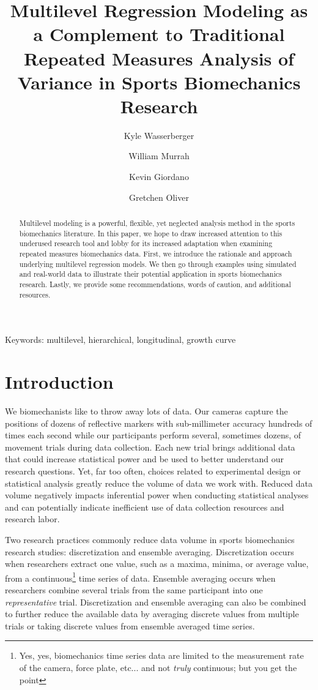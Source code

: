 \documentclass[
]{article}
\author[1]{\footnotesize Kyle Wasserberger}
\author[3]{\footnotesize William Murrah}
\author[4]{\footnotesize Kevin Giordano}
\author[2]{\footnotesize Gretchen Oliver}
\affil[1]{Research \& Development; Driveline Baseball}
\affil[2]{School of Kinesiology; Auburn University}
\affil[3]{\footnotesize Department of Educational Foundations, Leadership, \& Technology; Auburn University}
\affil[4]{\footnotesize Department of Physical Therapy; Creighton University}
\title{Multilevel Regression Modeling as a Complement to Traditional Repeated Measures Analysis of Variance in Sports Biomechanics Research}
\date{\vspace{-2.5em}}
\begin{document}
\maketitle

\begin{center}
Keywords: multilevel, hierarchical, longitudinal, growth curve
\end{center}

\newpage
\linenumbers
\begin{abstract}
\doublespacing
Multilevel modeling is a powerful, flexible, yet neglected analysis method in the sports biomechanics literature. In this paper, we hope to draw increased attention to this underused research tool and lobby for its increased adaptation when examining repeated measures biomechanics data. First, we introduce the rationale and approach underlying multilevel regression models. We then go through examples using simulated and real-world data to illustrate their potential application in sports biomechanics research. Lastly, we provide some recommendations, words of caution, and additional resources.
\end{abstract}

\newpage
{}

\hypertarget{introduction}{%
\section{Introduction}\label{introduction}}

\doublespacing

We biomechanists like to throw away lots of data. Our cameras capture the positions of dozens of reflective markers with sub-millimeter accuracy hundreds of times each second while our participants perform several, sometimes dozens, of movement trials during data collection. Each new trial brings additional data that could increase statistical power and be used to better understand our research questions. Yet, far too often, choices related to experimental design or statistical analysis greatly reduce the volume of data we work with. Reduced data volume negatively impacts inferential power when conducting statistical analyses and can potentially indicate inefficient use of data collection resources and research labor.

Two research practices commonly reduce data volume in sports biomechanics research studies: discretization and ensemble averaging. Discretization occurs when researchers extract one value, such as a maxima, minima, or average value, from a continuous\footnote{Yes, yes, biomechanics time series data are limited to the measurement rate of the camera, force plate, etc... and not \textit{truly} continuous; but you get the point} time series of data. Ensemble averaging occurs when researchers combine several trials from the same participant into one \emph{representative} trial. Discretization and ensemble averaging can also be combined to further reduce the available data by averaging discrete values from multiple trials or taking discrete values from ensemble averaged time series.
\end{document}
